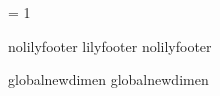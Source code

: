 \ifx\pdfoutput\undefined  
  
\else
  \ifx\pdfoutput\relax
    
  \else
    \pdfoutput = 1
    
  \fi
\fi

\def\EndLilyPondOutput{
  \ifundefined{lilypondpaperlastpagefill}
    \vskip 0pt plus \lilypondpaperinterscorelinefill00 fill
  \fi
  \csname bye\endcsname
}


\ifx\csname nolilyfooter\endcsname\relax
  \csname lilyfooter\texsuffix\endcsname
\else
  \csname nolilyfooter\texsuffix\endcsname
\fi

\ifx\outputscale\undefined
  \csname global\endcsname\csname newdimen\endcsname\outputscale
  \csname global\endcsname\csname newdimen\endcsname\scoreshift
\fi

\endlinechar \lilyponddefsELC
\endinput
